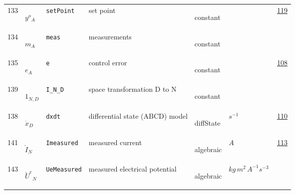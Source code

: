 \begin{longtable}{|p{1cm}|p{2.5cm}|p{4.5cm}|p{8cm}|p{3.0cm}|p{3cm}|p{1cm}|}
            133
             & \hypertarget{"v:133"}{ $ {{y^o}}{_{A}} $}
             & \verb|setPoint|
             & set point
             & \begin{lay}constant \end{lay}
             & $  $
             &                 \hyperlink{"e:119"}{ 119 }
                 \\
            134
             & \hypertarget{"v:134"}{ $ {m}{_{A}} $}
             & \verb|meas|
             & measurements
             & \begin{lay}constant \end{lay}
             & $  $
             & \\
            135
             & \hypertarget{"v:135"}{ $ {e}{_{A}} $}
             & \verb|e|
             & control error
             & \begin{lay}constant \end{lay}
             & $  $
             &                 \hyperlink{"e:108"}{ 108 }
                 \\
            139
             & \hypertarget{"v:139"}{ $ {1}{_{N, D}} $}
             & \verb|I_N_D|
             & space transformation D to N
             & \begin{lay}constant \end{lay}
             & $  $
             & \\
            138
             & \hypertarget{"v:138"}{ $ {{\dot{x}}}{_{D}} $}
             & \verb|dxdt|
             & differential state (ABCD) model
             & \begin{lay}diffState \end{lay}
             & $ s^{-1} \, $
             &                 \hyperlink{"e:110"}{ 110 }
                 \\
            141
             & \hypertarget{"v:141"}{ $ {{\check{I}}}{_{N}} $}
             & \verb|Imeasured|
             & measured current
             & \begin{lay}algebraic \end{lay}
             & $ A \, $
             &                 \hyperlink{"e:113"}{ 113 }
                 \\
            143
             & \hypertarget{"v:143"}{ $ {{\check{U}^e}}{_{N}} $}
             & \verb|UeMeasured|
             & measured electrical potential
             & \begin{lay}algebraic \end{lay}
             & $ kg \,m^{2} \,A^{-1} s^{-3} \, $

\end{longtable}
